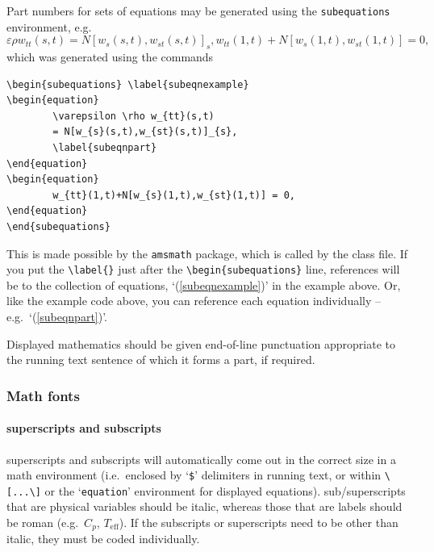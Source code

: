 \documentclass[]{interact}
\theoremstyle{plain}%
\theoremstyle{definition}
\theoremstyle{remark}
\begin{document}
Part numbers for sets of equations may be generated using the \texttt{subequations} environment, e.g.
\begin{subequations} \label{subeqnexample}
\begin{equation}
        \varepsilon \rho w_{tt}(s,t)
        = N[w_{s}(s,t),w_{st}(s,t)]_{s},
        \label{subeqnpart}
\end{equation}
\begin{equation}
        w_{tt}(1,t)+N[w_{s}(1,t),w_{st}(1,t)] = 0,
\end{equation}
\end{subequations}
which was generated using the commands
\begin{verbatim}
\begin{subequations} \label{subeqnexample}
\begin{equation}
        \varepsilon \rho w_{tt}(s,t)
        = N[w_{s}(s,t),w_{st}(s,t)]_{s},
        \label{subeqnpart}
\end{equation}
\begin{equation}
        w_{tt}(1,t)+N[w_{s}(1,t),w_{st}(1,t)] = 0,
\end{equation}
\end{subequations}
\end{verbatim}
This is made possible by the \texttt{amsmath} package, which is called by the class file. If you put the \verb"\label{}" just after the \verb"\begin{subequations}" line, references will be to the collection of equations, `(\ref{subeqnexample})' in the example above. Or, like the example code above, you can reference each equation individually -- e.g.\ `(\ref{subeqnpart})'.

Displayed mathematics should be given end-of-line punctuation appropriate to the running text sentence of which it forms a part, if required.

\subsubsection{Math fonts}

\paragraph{superscripts and subscripts}
superscripts and subscripts will automatically come out in the correct size in a math environment (i.e.\ enclosed by `\verb"$"' delimiters in running text, or within \verb"\[...\]" or the `\texttt{equation}' environment for displayed equations). sub/superscripts that are physical variables should be italic, whereas those that are labels should be roman (e.g.\ $C_p$, $T_\mathrm{eff}$). If the subscripts or superscripts need to be other than italic, they must be coded individually.
\end{document}
